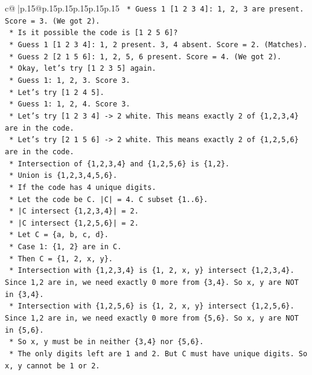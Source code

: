 \documentclass{article}
\begin{document}
{\begin{supertabular}{c@{$\;$}|p{.15\linewidth}@{}p{.15\linewidth}p{.15\linewidth}p{.15\linewidth}p{.15\linewidth}p{.15\linewidth}}
{{{\texttt{        *   Guess 1 {[}1 2 3 4{]}: 1, 2, 3 are present. Score = 3. (We got 2).} \\
\texttt{    *   Is it possible the code is {[}1 2 5 6{]}?} \\
\texttt{        *   Guess 1 {[}1 2 3 4{]}: 1, 2 present. 3, 4 absent. Score = 2. (Matches).} \\
\texttt{        *   Guess 2 {[}2 1 5 6{]}: 1, 2, 5, 6 present. Score = 4. (We got 2).} \\
\texttt{    *   Okay, let's try {[}1 2 3 5{]} again.} \\
\texttt{        *   Guess 1: 1, 2, 3. Score 3.} \\
\texttt{    *   Let's try {[}1 2 4 5{]}.} \\
\texttt{        *   Guess 1: 1, 2, 4. Score 3.} \\
\texttt{    *   Let's try {[}1 2 3 4{]} {-}> 2 white. This means exactly 2 of \{1,2,3,4\} are in the code.} \\
\texttt{    *   Let's try {[}2 1 5 6{]} {-}> 2 white. This means exactly 2 of \{1,2,5,6\} are in the code.} \\
\texttt{    *   Intersection of \{1,2,3,4\} and \{1,2,5,6\} is \{1,2\}.} \\
\texttt{    *   Union is \{1,2,3,4,5,6\}.} \\
\texttt{    *   If the code has 4 unique digits.} \\
\texttt{    *   Let the code be C. |C| = 4. C subset \{1..6\}.} \\
\texttt{    *   |C intersect \{1,2,3,4\}| = 2.} \\
\texttt{    *   |C intersect \{1,2,5,6\}| = 2.} \\
\texttt{    *   Let C = \{a, b, c, d\}.} \\
\texttt{    *   Case 1: \{1, 2\} are in C.} \\
\texttt{        *   Then C = \{1, 2, x, y\}.} \\
\texttt{        *   Intersection with \{1,2,3,4\} is \{1, 2, x, y\} intersect \{1,2,3,4\}. Since 1,2 are in, we need exactly 0 more from \{3,4\}. So x, y are NOT in \{3,4\}.} \\
\texttt{        *   Intersection with \{1,2,5,6\} is \{1, 2, x, y\} intersect \{1,2,5,6\}. Since 1,2 are in, we need exactly 0 more from \{5,6\}. So x, y are NOT in \{5,6\}.} \\
\texttt{        *   So x, y must be in neither \{3,4\} nor \{5,6\}.} \\
\texttt{        *   The only digits left are 1 and 2. But C must have unique digits. So x, y cannot be 1 or 2.} \\
}}}
\end{supertabular}}
\end{document}
